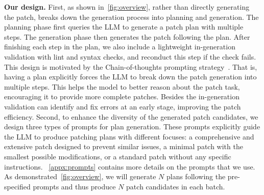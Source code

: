 \textbf{Our design.}
First, as shown in~\cref{fig:overview}, rather than directly generating the patch, \sys breaks down the generation process into planning and generation. 
The planning phase first queries the LLM to generate a patch plan with multiple steps. 
The generation phase then generates the patch following the plan.
After finishing each step in the plan, we also include a lightweight in-generation validation with lint and syntax checks, and reconduct this step if the check fails. 
This design is motivated by the Chain-of-thoughts prompting strategy~\cite{wei2022chain}.
That is, having a plan explicitly forces the LLM to break down the patch generation into multiple steps.
This helps the model to better reason about the patch task, encouraging it to provide more complete patches. 
Besides the in-generation validation can identify and fix errors at an early stage, improving the patch efficiency. 
Second, to enhance the diversity of the generated patch candidates, we design three types of prompts for plan generation. 
These prompts explicitly guide the LLM to produce patching plans with different focuses: a comprehensive and extensive patch designed to prevent similar issues, a minimal patch with the smallest possible modifications, or a standard patch without any specific instructions.
~\cref{appx:prompts} contains more details on the prompts that we use.
As demonstrated~\cref{fig:overview}, we will generate $N$ plans following the pre-specified prompts and thus produce $N$ patch candidates in each batch.   
